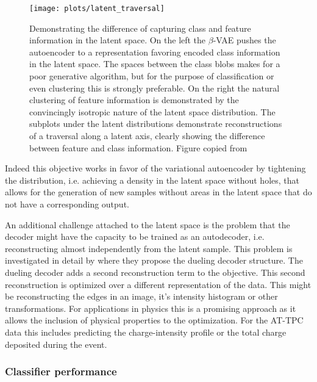 \begin{figure}
\centering
\texttt{[image: plots/latent\_traversal]}
\caption[Difference between generative and discriminative latent spaces]{Demonstrating the difference of capturing class and feature information in the latent space. On the left the $\beta$-VAE pushes the autoencoder to a representation favoring encoded class information in the latent space. The spaces between the class blobs makes for a poor generative algorithm, but for the purpose of classification or even clustering this is strongly preferable. On the right the natural clustering of feature information is demonstrated by the convincingly isotropic nature of the latent space distribution. The subplots under the latent distributions demonstrate reconstructions of a traversal along a latent axis, clearly showing the difference between feature and class information. Figure copied from \citet{Antoran2019}}\label{fig:latent_traversal}
\end{figure}

Indeed this objective works in favor of the variational autoencoder by tightening the distribution, i.e. achieving a density in the latent space without holes, that allows for the generation of new samples without areas in the latent space that do not have a corresponding output. 

An additional challenge attached to the latent space is the problem that the decoder might have the capacity to be trained as an autodecoder, i.e. reconstructing almost independently from the latent sample. This problem is investigated in detail by  where they propose the dueling decoder structure. The dueling decoder adds a second reconstruction term to the objective. This second reconstruction is optimized over a different representation of the data. This might be reconstructing the edges in an image, it's intensity histogram or other transformations. For applications in physics this is a promising approach as it allows the inclusion of physical properties to the optimization. For the AT-TPC data this includes predicting the charge-intensity profile or the total charge deposited during the event.

\subsubsection{Classifier performance}

